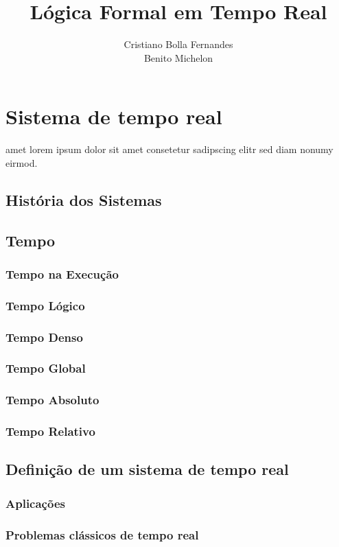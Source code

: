 \documentclass{article}
\author{
	Cristiano Bolla Fernandes \\
	Benito Michelon \\
}
\title {Lógica Formal em Tempo Real}
\begin{document}
\maketitle
\newpage


\section{Sistema de tempo real}
amet lorem ipsum dolor sit amet consetetur sadipscing elitr sed
diam nonumy eirmod.~\cite{PICCOLIDM08}

	\subsection{História dos Sistemas}
	\subsection{Tempo}
		\subsubsection{Tempo na Execução}
		\subsubsection{Tempo Lógico}
		\subsubsection{Tempo Denso}
		\subsubsection{Tempo Global}
		\subsubsection{Tempo Absoluto}
		\subsubsection{Tempo Relativo}
	\subsection{Definição de um sistema de tempo real}
		\subsubsection{Aplicações}
		\subsubsection{Problemas clássicos de tempo real}
\end{document}

